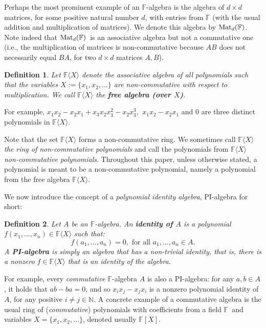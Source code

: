\documentclass[12pt,reqno]{article}
\newtheorem{definition}{Definition}
\newcommand\F{\ensuremath{\mathbb F}}
\newcommand\N{\ensuremath{\mathbb N}}
\newcommand{\matd}{{\ensuremath{{\rm Mat}_d(\F)}}}
\newcommand{\freea}{\ensuremath{\F\langle X\rangle}}
\newcommand{\iddocomment}[2][]
{\todo[size=\tiny, caption={#2}, #1, linecolor=green!70!white,         backgroundcolor=blue!10!white,bordercolor=white]
{{#2}}}
\begin{document}
Perhaps the most prominent example of an $\F$-algebra is the algebra of $d\times d$ matrices, for some  positive natural number $d$, with entries from $\F$ (with the usual addition and multiplication of matrices). We denote this algebra by \matd. Note indeed that \matd\ is an associative algebra but not a commutative one (i.e., the multiplication of matrices is non-commutative because $AB$ does not necessarily equal $BA$, for two $d\times d$ matrices $A,B$).


\begin{definition}
Let $\freea$ denote the associative algebra of all polynomials such that the variables $X:=\{x_1,x_2,\ldots \}$ are non-commutative with respect to multiplication. \iddocomment{Should be finite? Countable?} We call $\freea$ the \textbf{free algebra (over $X$)}.
\end{definition}
For example, $x_1 x_2-x_2 x_1+x_3 x_2 x_3^2-x_2 x_3^3,\  \, x_1 x_2-x_2 x_1$ and $0$ are three distinct polynomials in $\freea$.

Note that the set $\freea$ forms a non-commutative ring. We sometimes call $\freea$ \emph{the ring of non-commutative polynomials} and call the polynomials from $\freea$ \emph{non-commutative polynomials}. Throughout this paper, unless otherwise stated, a polynomial is meant to be a non-commutative polynomial, namely a polynomial from the free algebra  $\freea$.




We now introduce the concept of a \textit{polynomial identity algebra}, PI-algebra for short:

\begin{definition}\label{def:PI-algebra}
Let $A$ be an \F-algebra. An \textbf{identity of $A$} is a polynomial $f(x_1,...,x_n)\in\freea$ such that: \[
f(a_1,...,a_n)=0,    \mbox{ for all } a_1,...,a_n\in A.
\]
A \textbf{PI-algebra} is simply an algebra that has a non-trivial identity, that is, there is a nonzero $f\in\freea$ that is an identity of the algebra.
\end{definition}

For example, every \textit{commutative} \F-algebra $A$ is also a PI-algebra: for any $a,b\in A$, it holds that $ab-ba = 0$, and so $x_i x_j - x_j x_i $ is a nonzero polynomial identity of $A$, for any positive $i\neq j\in \N$. A  concrete example of a commutative algebra is the usual ring of (\emph{commutative}) polynomials with coefficients from a field \F\ and variables $X=\{x_1,x_2,\ldots\}$, denoted usually $\F[X]$.
\end{document}
